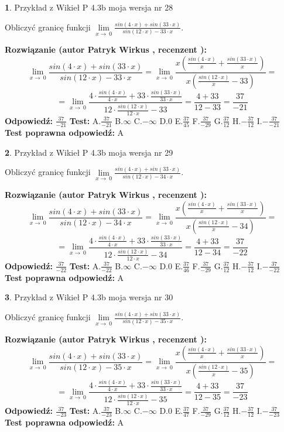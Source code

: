 \documentclass[12pt, a4paper]{article}
\theoremstyle{definition} %
\newtheorem{zad}{}
\newcommand{\zadStart}[1]{\begin{zad}#1\newline}
\newcommand{\zadStop}{\end{zad}}
\newcommand{\rozwStart}[2]{\noindent \textbf{Rozwiązanie (autor #1 , recenzent #2): }\newline}
\newcommand{\rozwStop}{\newline}
\newcommand{\odpStart}{\noindent \textbf{Odpowiedź:}\newline}
\newcommand{\odpStop}{\newline}
\newcommand{\testStart}{\noindent \textbf{Test:}\newline}
\newcommand{\testStop}{\newline}
\newcommand{\kluczStart}{\noindent \textbf{Test poprawna odpowiedź:}\newline}
\newcommand{\kluczStop}{\newline}
\begin{document}
\zadStart{Przykład z Wikieł P 4.3b moja wersja nr 28}


Obliczyć granicę funkcji $\lim\limits_{x\to\ 0}\frac{sin(4 \cdot x)+sin(33 \cdot x)}{sin(12 \cdot x)-33 \cdot x}$.
\zadStop
\rozwStart{Patryk Wirkus}{}
$$\lim\limits_{x\to\ 0}\frac{sin(4 \cdot x)+sin(33 \cdot x)}{sin(12 \cdot x)-33 \cdot x}=\lim\limits_{x\to\ 0}\frac{x(\frac{sin(4 \cdot x)}{x}+\frac{sin(33 \cdot x)}{x})}{x(\frac{sin(12 \cdot x)}{x}-33)}=$$
$$=\lim\limits_{x\to\ 0}\frac{4 \cdot \frac{sin(4 \cdot x)}{4 \cdot x}+33 \cdot \frac{sin(33 \cdot x)}{33 \cdot x}}{12 \cdot \frac{sin(12 \cdot x)}{12 \cdot x}-33}=\frac{4+33}{12-33} = \frac{37}{-21}$$
\rozwStop
\odpStart
$\frac{37}{-21}$
\odpStop
\testStart
A.$\frac{37}{-21}$
B.$\infty$
C.$-\infty$
D.$0$
E.$\frac{37}{45}$
F.$\frac{37}{-29}$
G.$\frac{37}{12}$
H.$-\frac{37}{12}$
I.$-\frac{37}{-21}$
\testStop
\kluczStart
A
\kluczStop



\zadStart{Przykład z Wikieł P 4.3b moja wersja nr 29}


Obliczyć granicę funkcji $\lim\limits_{x\to\ 0}\frac{sin(4 \cdot x)+sin(33 \cdot x)}{sin(12 \cdot x)-34 \cdot x}$.
\zadStop
\rozwStart{Patryk Wirkus}{}
$$\lim\limits_{x\to\ 0}\frac{sin(4 \cdot x)+sin(33 \cdot x)}{sin(12 \cdot x)-34 \cdot x}=\lim\limits_{x\to\ 0}\frac{x(\frac{sin(4 \cdot x)}{x}+\frac{sin(33 \cdot x)}{x})}{x(\frac{sin(12 \cdot x)}{x}-34)}=$$
$$=\lim\limits_{x\to\ 0}\frac{4 \cdot \frac{sin(4 \cdot x)}{4 \cdot x}+33 \cdot \frac{sin(33 \cdot x)}{33 \cdot x}}{12 \cdot \frac{sin(12 \cdot x)}{12 \cdot x}-34}=\frac{4+33}{12-34} = \frac{37}{-22}$$
\rozwStop
\odpStart
$\frac{37}{-22}$
\odpStop
\testStart
A.$\frac{37}{-22}$
B.$\infty$
C.$-\infty$
D.$0$
E.$\frac{37}{46}$
F.$\frac{37}{-29}$
G.$\frac{37}{12}$
H.$-\frac{37}{12}$
I.$-\frac{37}{-22}$
\testStop
\kluczStart
A
\kluczStop



\zadStart{Przykład z Wikieł P 4.3b moja wersja nr 30}


Obliczyć granicę funkcji $\lim\limits_{x\to\ 0}\frac{sin(4 \cdot x)+sin(33 \cdot x)}{sin(12 \cdot x)-35 \cdot x}$.
\zadStop
\rozwStart{Patryk Wirkus}{}
$$\lim\limits_{x\to\ 0}\frac{sin(4 \cdot x)+sin(33 \cdot x)}{sin(12 \cdot x)-35 \cdot x}=\lim\limits_{x\to\ 0}\frac{x(\frac{sin(4 \cdot x)}{x}+\frac{sin(33 \cdot x)}{x})}{x(\frac{sin(12 \cdot x)}{x}-35)}=$$
$$=\lim\limits_{x\to\ 0}\frac{4 \cdot \frac{sin(4 \cdot x)}{4 \cdot x}+33 \cdot \frac{sin(33 \cdot x)}{33 \cdot x}}{12 \cdot \frac{sin(12 \cdot x)}{12 \cdot x}-35}=\frac{4+33}{12-35} = \frac{37}{-23}$$
\rozwStop
\odpStart
$\frac{37}{-23}$
\odpStop
\testStart
A.$\frac{37}{-23}$
B.$\infty$
C.$-\infty$
D.$0$
E.$\frac{37}{47}$
F.$\frac{37}{-29}$
G.$\frac{37}{12}$
H.$-\frac{37}{12}$
I.$-\frac{37}{-23}$
\testStop
\kluczStart
A
\kluczStop
\end{document}
